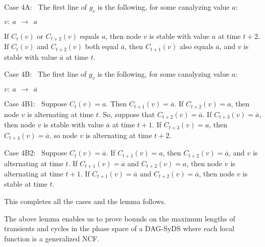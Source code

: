 \begin{description}
\item{\textsf{Case 4A:}}~ The first line of $g_v$ is the following, 
for some canalyzing value $a$:

\noindent
\hspace*{1.1in} $v:~ a ~~\longrightarrow~~ a$

\medskip

If $C_t(v)$ or $C_{t+2}(v)$ equals $a$, then node $v$ is stable
with value $a$ at time $t+2$.  If  $C_t(v)$  and $C_{t+2}(v)$ both
equal $\overline{a}$, then $C_{t+1}(v)$ also equals $\overline{a}$,
and $v$ is stable with value $\overline{a}$ at time $t$.

\item{\textsf{Case 4B:}}~ The first line of $g_v$ is the following,
for some canalyzing value $a$:

\noindent
\hspace*{1.1in} $v:~ a ~~\longrightarrow~~ \overline{a}$


\begin{description}
\item{\textsf{Case 4B1:}}~ Suppose $C_t(v) = a$. 
Then $C_{t+1}(v) =  \overline{a}$. 
If $C_{t+2}(v) = a$, then node $v$ is alternating at time $t$.
So, suppose that $C_{t+2}(v) = \overline{a}$.
If $C_{t+3}(v) = \overline{a}$,
then node $v$ is stable with value $\overline{a}$ at time $t+1$.
If $C_{t+3}(v) = a$, then $C_{t+4}(v) = \overline{a}$,
so node $v$ is alternating at time $t+2$.

\item{\textsf{Case 4B2:}}~ Suppose $C_t(v) = \overline{a}$.
If $C_{t+1}(v) = a$, then $C_{t+2}(v) = \overline{a}$,
and $v$ is alternating at time $t$.
If $C_{t+1}(v) = \overline{a}$ and $C_{t+2}(v) = a$, then node $v$ is alternating at time $t+1$.
If $C_{t+1}(v) = \overline{a}$ and $C_{t+2}(v) =  \overline{a}$, then node $v$ is stable at time $t$.
\end{description} %
\end{description}

This completes all the cases and the lemma follows. \QED

\medskip

The above lemma enables us to prove bounds on the maximum
lengths of transients and cycles in the phase space of a DAG-SyDS
where each local function is a generalized NCF.

\medskip

